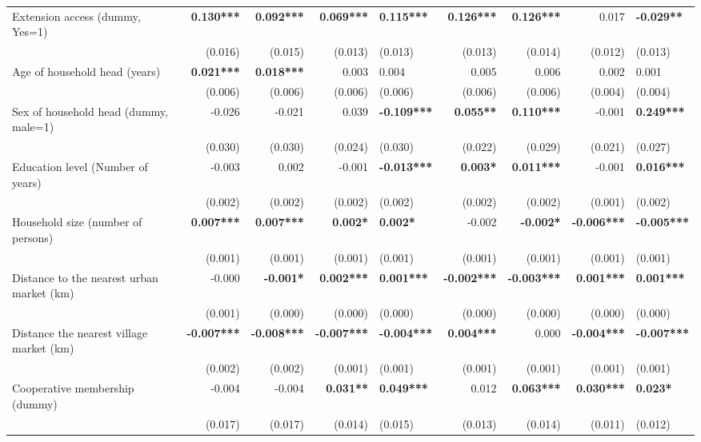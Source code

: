 \documentclass[
]{article}
\begin{document}
\begin{landscape}
\begin{longtable}[t]{lrrrlrrrl}
\endfoot
\bottomrule
\endlastfoot
Extension access (dummy, Yes=1) & \textbf{0.130***} & \textbf{0.092***} & \textbf{0.069***} & \textbf{0.115***} & \textbf{0.126***} & \textbf{0.126***} & 0.017 & \textbf{-0.029**}\\
 & (0.016) & (0.015) & (0.013) & (0.013) & (0.013) & (0.014) & (0.012) & (0.013)\\
Age of household head (years) & \textbf{0.021***} & \textbf{0.018***} & 0.003 & 0.004 & 0.005 & 0.006 & 0.002 & 0.001\\
 & (0.006) & (0.006) & (0.006) & (0.006) & (0.006) & (0.006) & (0.004) & (0.004)\\
Sex of household head (dummy, male=1) & -0.026 & -0.021 & 0.039 & \textbf{-0.109***} & \textbf{0.055**} & \textbf{0.110***} & -0.001 & \textbf{0.249***}\\
\addlinespace
 & (0.030) & (0.030) & (0.024) & (0.030) & (0.022) & (0.029) & (0.021) & (0.027)\\
Education level (Number of years) & -0.003 & 0.002 & -0.001 & \textbf{-0.013***} & \textbf{0.003*} & \textbf{0.011***} & -0.001 & \textbf{0.016***}\\
 & (0.002) & (0.002) & (0.002) & (0.002) & (0.002) & (0.002) & (0.001) & (0.002)\\
Household size (number of persons) & \textbf{0.007***} & \textbf{0.007***} & \textbf{0.002*} & \textbf{0.002*} & -0.002 & \textbf{-0.002*} & \textbf{-0.006***} & \textbf{-0.005***}\\
 & (0.001) & (0.001) & (0.001) & (0.001) & (0.001) & (0.001) & (0.001) & (0.001)\\
\addlinespace
Distance to the nearest urban market (km) & -0.000 & \textbf{-0.001*} & \textbf{0.002***} & \textbf{0.001***} & \textbf{-0.002***} & \textbf{-0.003***} & \textbf{0.001***} & \textbf{0.001***}\\
 & (0.001) & (0.000) & (0.000) & (0.000) & (0.000) & (0.000) & (0.000) & (0.000)\\
Distance the nearest village market (km) & \textbf{-0.007***} & \textbf{-0.008***} & \textbf{-0.007***} & \textbf{-0.004***} & \textbf{0.004***} & 0.000 & \textbf{-0.004***} & \textbf{-0.007***}\\
 & (0.002) & (0.002) & (0.001) & (0.001) & (0.001) & (0.001) & (0.001) & (0.001)\\
Cooperative membership (dummy) & -0.004 & -0.004 & \textbf{0.031**} & \textbf{0.049***} & 0.012 & \textbf{0.063***} & \textbf{0.030***} & \textbf{0.023*}\\
\addlinespace
 & (0.017) & (0.017) & (0.014) & (0.015) & (0.013) & (0.014) & (0.011) & (0.012)\\

\end{longtable}
\end{landscape}
\end{document}
